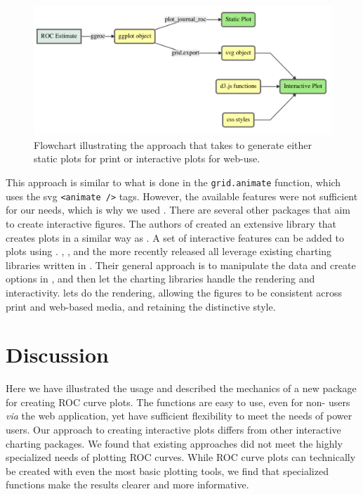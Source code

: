 \documentclass[article]{jss}
\begin{document}
\begin{figure}[ht]
\centering
\includegraphics{figure/diagram.pdf}
\caption{Flowchart illustrating the approach that  takes to generate either static plots for print or interactive plots for web-use. \label{flow}}
\end{figure}

This approach is similar to what is done in the 
\texttt{grid.animate} function, which uses the svg
\texttt{\textless{}animate /\textgreater{}} tags. However, the available
features were not sufficient for our needs, which is why we used
. There are several other  packages that aim to
create interactive figures. The authors of  \citep{animint}
created an extensive  library that creates plots in
a similar way as . A set of interactive features can be
added to plots using .  \citep{ggvis},
 \citep{rcharts}, and the more recently released
 \citep{htmlwidgets} all leverage existing charting
libraries written in . Their general approach is to
manipulate the data and create options in , and then let the
charting libraries handle the rendering and interactivity. 
lets  do the rendering, allowing the figures to be
consistent across print and web-based media, and retaining the
distinctive  style.

\section{Discussion}\label{discussion}

Here we have illustrated the usage and described the mechanics of a new
 package for creating ROC curve plots. The functions are
easy to use, even for non- users \emph{via} the web
application, yet have sufficient flexibility to meet the needs of power
users. Our approach to creating interactive plots differs from other
interactive charting packages. We found that existing approaches did not
meet the highly specialized needs of plotting ROC curves. While ROC
curve plots can technically be created with even the most basic plotting
tools, we find that specialized functions make the results clearer and
more informative.


%

\end{document}
